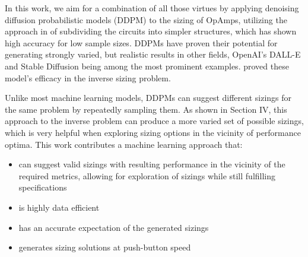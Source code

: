 \documentclass[conference]{IEEEtran}
\begin{document}
	In this work, we aim for a combination of all those virtues by applying denoising diffusion probabilistic models (DDPM) to the sizing of OpAmps, utilizing the approach in \cite{leibl24inverse} of subdividing the circuits into simpler structures, which has shown high accuracy for low sample sizes. DDPMs have proven their potential for generating strongly varied, but realistic results in other fields, OpenAI's DALL-E and Stable Diffusion being among the most prominent examples. \cite{eid24diffusion} proved these model's efficacy in the inverse sizing problem.
	
	Unlike most machine learning models, DDPMs can suggest different sizings for the same problem by repeatedly sampling them.
	As shown in Section IV, this approach to the inverse problem can produce a more varied set of possible sizings, which is very helpful when exploring sizing options in the vicinity of performance optima. 
This work contributes a machine learning approach that:
	\begin{itemize}
	\item can suggest valid sizings with resulting performance in the vicinity of the required metrics, allowing for exploration of sizings while still fulfilling specifications
	\item is highly data efficient
	\item has an accurate expectation of the generated sizings
	\item generates sizing solutions at push-button speed
	\end{itemize}
	
\end{document}
